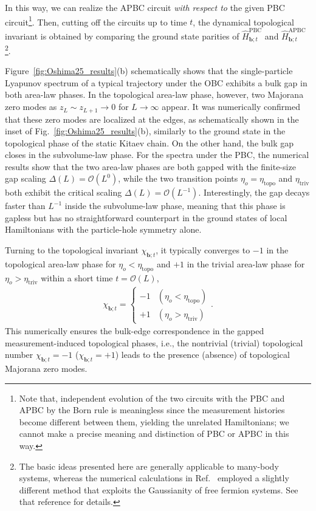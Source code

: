 \documentclass[preprint,pteplogo]{ptephy_v2}%
\numberwithin{equation}{section}
\theoremstyle{definition}
\begin{document}
In this way, we can realize the APBC circuit \textit{with respect to} the given PBC circuit\footnote{
Note that, independent evolution of the two circuits with the PBC and APBC by the Born rule is meaningless since the measurement histories become different between them, yielding the unrelated Hamiltonians; we cannot make a precise meaning and distinction of PBC or APBC in this way.
}.
Then, cutting off the circuits up to time $t$, the dynamical topological invariant is obtained by comparing the ground state parities of $\hat{H}_{\bm{b};t}^{\mathrm{PBC}}$ and $\hat{H}_{\bm{b};t}^{\mathrm{APBC}}$\footnote{
The basic ideas presented here are generally applicable to many-body systems, whereas the numerical calculations in Ref.~\cite{oshima2025topology} employed a slightly different method that exploits the Gaussianity of free fermion systems.
See that reference for details.
}.

Figure~\ref{fig:Oshima25_results}(b) schematically shows that the single-particle Lyapunov spectrum of a typical trajectory under the OBC exhibits a bulk gap in both area-law phases.
In the topological area-law phase, however, two Majorana zero modes as $z_L \sim z_{L+1} \to 0$ for $L \to \infty$ appear.
It was numerically confirmed that these zero modes are localized at the edges, as schematically shown in the inset of Fig.~\ref{fig:Oshima25_results}(b), similarly to the ground state in the topological phase of the static Kitaev chain.
On the other hand, the bulk gap closes in the subvolume-law phase.
For the spectra under the PBC, the numerical results show that the two area-law phases are both gapped with the finite-size gap scaling $\Delta(L)=\mathcal{O}(L^0)$, while the two transition points $\eta_o=\eta_{\mathrm{topo}}$ and $\eta_{\mathrm{triv}}$ both exhibit the critical scaling $\Delta(L)= \mathcal{O}(L^{-1})$.
Interestingly, the gap decays faster than $L^{-1}$ inside the subvolume-law phase, meaning that this phase is gapless but has no straightforward counterpart in the ground states of local Hamiltonians with the particle-hole symmetry alone.

Turning to the topological invariant $\chi_{\bm{b};t}$, it typically converges to $-1$ in the topological area-law phase for $\eta_o<\eta_\mathrm{topo}$ and $+1$ in the trivial area-law phase for $\eta_o>\eta_\mathrm{triv}$ within a short time $t = \mathcal{O}(L)$,
\begin{align}
    \chi_{\bm{b};t}=\begin{cases}
        -1&(\eta_o<\eta_\mathrm{topo})\\
        +1&(\eta_o>\eta_\mathrm{triv})
    \end{cases}.
\end{align}
This numerically ensures the bulk-edge correspondence in the gapped measurement-induced topological phases, i.e., the nontrivial (trivial) topological number $\chi_{\bm{b};t}=-1$ ($\chi_{\bm{b};t}=+1$) leads to the presence (absence) of topological Majorana zero modes.
\end{document}
